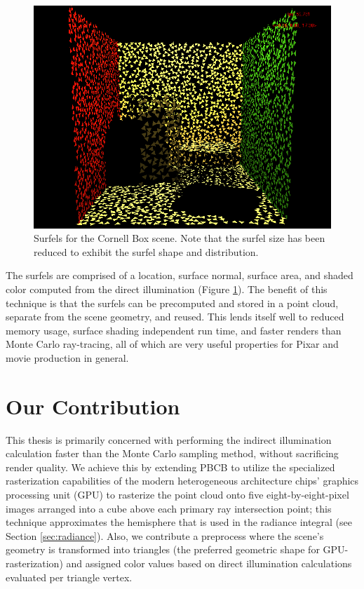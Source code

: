 \begin{figure}[p]
   \centering
   \includegraphics[width=130mm]{../img/surfel_cloud_tris.png}
   \captionfonts
   \caption[Cornell Box surfels]{Surfels for the Cornell Box scene. Note that the surfel size has been reduced to exhibit the surfel shape and distribution.}
   \label{fig:surfels}
\end{figure}

The surfels are comprised of a location, surface normal, surface area, and shaded color computed from the direct illumination (Figure \ref{fig:surfels}). The benefit of this technique is that the surfels can be precomputed and stored in a point cloud, separate from the scene geometry, and reused. This lends itself well to reduced memory usage, surface shading independent run time, and faster renders than Monte Carlo ray-tracing, all of which are very useful properties for Pixar and movie production in general.

\section{Our Contribution}
This thesis is primarily concerned with performing the indirect illumination calculation faster than the Monte Carlo sampling method, without sacrificing render quality. We achieve this by extending PBCB to utilize the specialized rasterization capabilities of the modern heterogeneous architecture chips' graphics processing unit (GPU) to rasterize the point cloud onto five eight-by-eight-pixel images arranged into a cube above each primary ray intersection point; this technique approximates the hemisphere that is used in the radiance integral (see Section \ref{sec:radiance}). Also, we contribute a preprocess where the scene's geometry is transformed into triangles (the preferred geometric shape for GPU-rasterization) and assigned color values based on direct illumination calculations evaluated per triangle vertex.

